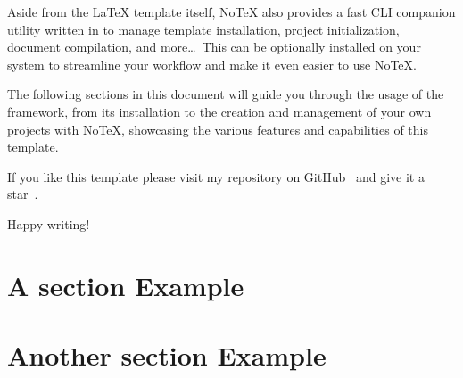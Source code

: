 \documentclass[light]{notex}
\begin{document}
Aside from the LaTeX template itself, NoTeX also provides a fast \gls{CLI} companion utility written in  to manage template installation, project initialization, document compilation, and more\dots\
This can be optionally installed on your system to streamline your workflow and make it even easier to use NoTeX.

The following sections in this document will guide you through the usage of the framework, from its installation to the creation and management of your own projects with NoTeX, showcasing the various features and capabilities of this template.

\vspace{1em}

If you like this template please visit my repository on GitHub~\cite{github} and give it a star~.

\begin{cbox}
\begin{center}
	 \; \href{https://github.com/marcotallone/notex}{}
\end{center}
\end{cbox}

Happy writing!

\pagebreak

\section{A section Example}

\blindtext

\section{Another section Example}

\blindtext


\pagebreak

\end{document}
